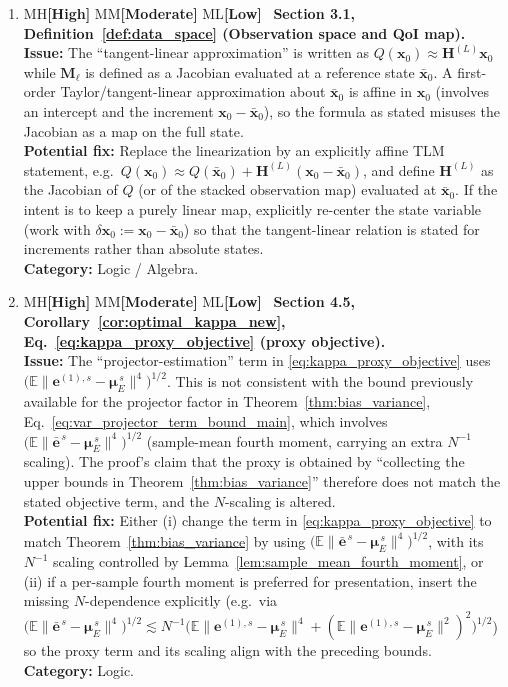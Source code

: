 \documentclass[11pt]{article}
\newcommand{\severity}[1]{%
  \ifx#1H\textcolor{severe}{\textbf{[High]}}\fi
  \ifx#1M\textcolor{moderate}{\textbf{[Moderate]}}\fi
  \ifx#1L\textcolor{minor}{\textbf{[Low]}}\fi
}
\begin{document}
\begin{enumerate}[leftmargin=*,itemsep=0.75em]
\item \severity{M}\ \textbf{Section 3.1, Definition~\ref{def:data_space} (Observation space and QoI map).}\\
\textbf{Issue:} The “tangent-linear approximation” is written as \(Q(\mathbf{x}_0)\approx \mathbf{H}^{(L)}\mathbf{x}_0\) while \(\mathbf{M}_\ell\) is defined as a Jacobian evaluated at a reference state \(\bar{\mathbf{x}}_0\). A first-order Taylor/tangent-linear approximation about \(\bar{\mathbf{x}}_0\) is affine in \(\mathbf{x}_0\) (involves an intercept and the increment \(\mathbf{x}_0-\bar{\mathbf{x}}_0\)), so the formula as stated misuses the Jacobian as a map on the full state.\\
\textbf{Potential fix:} Replace the linearization by an explicitly affine TLM statement, e.g.\ \(Q(\mathbf{x}_0)\approx Q(\bar{\mathbf{x}}_0)+\mathbf{H}^{(L)}(\mathbf{x}_0-\bar{\mathbf{x}}_0)\), and define \(\mathbf{H}^{(L)}\) as the Jacobian of \(Q\) (or of the stacked observation map) evaluated at \(\bar{\mathbf{x}}_0\). If the intent is to keep a purely linear map, explicitly re-center the state variable (work with \(\delta\mathbf{x}_0:=\mathbf{x}_0-\bar{\mathbf{x}}_0\)) so that the tangent-linear relation is stated for increments rather than absolute states.\\
\textbf{Category:} Logic / Algebra.

\item \severity{M}\ \textbf{Section 4.5, Corollary~\ref{cor:optimal_kappa_new}, Eq.~\eqref{eq:kappa_proxy_objective} (proxy objective).}\\
\textbf{Issue:} The “projector-estimation” term in \eqref{eq:kappa_proxy_objective} uses \(\bigl(\mathbb{E}\|\mathbf{e}^{(1),s}-\boldsymbol{\mu}_E^{\,s}\|^4\bigr)^{1/2}\). This is not consistent with the bound previously available for the projector factor in Theorem~\ref{thm:bias_variance}, Eq.~\eqref{eq:var_projector_term_bound_main}, which involves \(\bigl(\mathbb{E}\|\bar{\mathbf{e}}^{\,s}-\boldsymbol{\mu}_E^{\,s}\|^4\bigr)^{1/2}\) (sample-mean fourth moment, carrying an extra \(N^{-1}\) scaling). The proof’s claim that the proxy is obtained by “collecting the upper bounds in Theorem~\ref{thm:bias_variance}” therefore does not match the stated objective term, and the \(N\)-scaling is altered.\\
\textbf{Potential fix:} Either (i) change the term in \eqref{eq:kappa_proxy_objective} to match Theorem~\ref{thm:bias_variance} by using \(\bigl(\mathbb{E}\|\bar{\mathbf{e}}^{\,s}-\boldsymbol{\mu}_E^{\,s}\|^4\bigr)^{1/2}\), with its \(N^{-1}\) scaling controlled by Lemma~\ref{lem:sample_mean_fourth_moment}, or (ii) if a per-sample fourth moment is preferred for presentation, insert the missing \(N\)-dependence explicitly (e.g.\ via \(\bigl(\mathbb{E}\|\bar{\mathbf{e}}^{\,s}-\boldsymbol{\mu}_E^{\,s}\|^4\bigr)^{1/2}\lesssim N^{-1}\bigl(\mathbb{E}\|\mathbf{e}^{(1),s}-\boldsymbol{\mu}_E^{\,s}\|^4+(\mathbb{E}\|\mathbf{e}^{(1),s}-\boldsymbol{\mu}_E^{\,s}\|^2)^2\bigr)^{1/2}\)) so the proxy term and its scaling align with the preceding bounds.\\
\textbf{Category:} Logic.


\end{enumerate}
\end{document}
